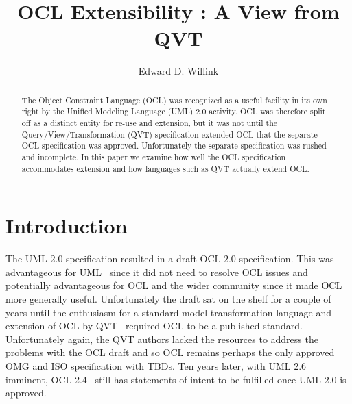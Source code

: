 \documentclass{llncs}
\begin{document}
%
\mainmatter              %
%
\title{OCL Extensibility : A View from QVT}
%
%
\author{Edward D. Willink}
%
%
%


\maketitle              %

\begin{abstract}
The Object Constraint Language (OCL) was recognized as a useful facility in its own right by the Unified Modeling Language (UML) 2.0 activity. OCL was  therefore split off as a distinct entity for re-use and extension, but it was not until the Query/View/Transformation (QVT) specification extended OCL that the separate OCL specification was approved. Unfortunately the separate specification was rushed and incomplete. In this paper we examine how well the OCL specification accommodates extension and how languages such as QVT actually extend OCL.

\end{abstract}
%
\section{Introduction}
%
The UML 2.0 specification resulted in a draft OCL 2.0 specification. This was advantageous for UML~\cite{UML-2.5} since it did not need to resolve OCL issues and potentially advantageous for OCL and the wider community since it made OCL more generally useful. Unfortunately the draft sat on the shelf for a couple of years until the enthusiasm for a standard model transformation language and extension of OCL by QVT~\cite{QVT-1.3} required OCL to be a published standard. Unfortunately again, the QVT authors lacked the resources to address the problems with the OCL draft and so OCL remains perhaps the only approved OMG and ISO specification with TBDs. Ten years later, with UML 2.6 imminent, OCL 2.4~\cite{OCL-2.4} still has statements of intent to be fulfilled once UML 2.0 is approved.
\end{document}
